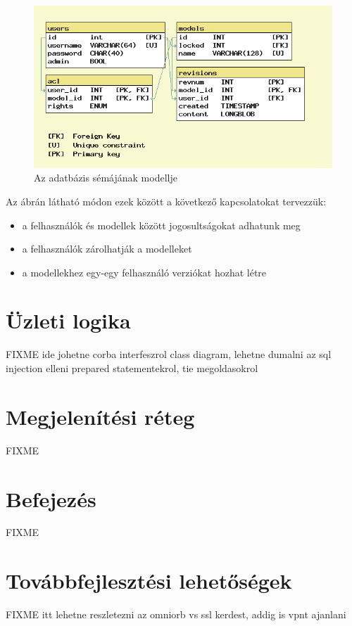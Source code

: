 \documentclass[a4paper,12pt]{article}
\begin{document}
\begin{figure}[H]
\centering
\includegraphics[width=120mm,keepaspectratio]{sqlschema.png}
\caption{Az adatbázis sémájának modellje}
\end{figure}

Az ábrán látható módon ezek között a következő kapcsolatokat tervezzük:

\begin{itemize}
\item a felhasználók és modellek között jogosultságokat adhatunk meg
\item a felhasználók zárolhatják a modelleket
\item a modellekhez egy-egy felhasználó verziókat hozhat létre
\end{itemize}

\section{Üzleti logika}

FIXME ide johetne corba interfeszrol class diagram, lehetne dumalni az sql
injection elleni prepared statementekrol, tie megoldasokrol

\section{Megjelenítési réteg}

FIXME

\section{Befejezés}

FIXME

\section{Továbbfejlesztési lehetőségek}

FIXME itt lehetne reszletezni az omniorb vs ssl kerdest, addig is vpnt ajanlani
\end{document}
